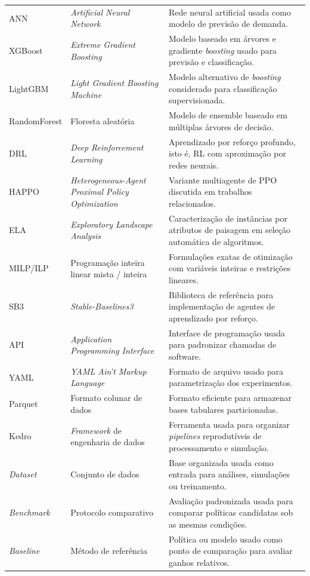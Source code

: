 \begin{longtable}{@{}>{\raggedright\arraybackslash}p{2.35cm}>{\raggedright\arraybackslash}p{5.05cm}>{\raggedright\arraybackslash}p{7.15cm}@{}}
ANN & \textit{Artificial Neural Network} & Rede neural artificial usada como modelo de previsão de demanda. \\
XGBoost & \textit{Extreme Gradient Boosting} & Modelo baseado em árvores e gradiente \textit{boosting} usado para previsão e classificação. \\
LightGBM & \textit{Light Gradient Boosting Machine} & Modelo alternativo de \textit{boosting} considerado para classificação supervisionada. \\
RandomForest & Floresta aleatória & Modelo de ensemble baseado em múltiplas árvores de decisão. \\
DRL & \textit{Deep Reinforcement Learning} & Aprendizado por reforço profundo, isto é, RL com aproximação por redes neurais. \\
HAPPO & \textit{Heterogeneous-Agent Proximal Policy Optimization} & Variante multiagente de PPO discutida em trabalhos relacionados. \\
ELA & \textit{Exploratory Landscape Analysis} & Caracterização de instâncias por atributos de paisagem em seleção automática de algoritmos. \\
MILP/ILP & Programação inteira linear mista / inteira & Formulações exatas de otimização com variáveis inteiras e restrições lineares. \\
SB3 & \textit{Stable-Baselines3} & Biblioteca de referência para implementação de agentes de aprendizado por reforço. \\
API & \textit{Application Programming Interface} & Interface de programação usada para padronizar chamadas de software. \\
YAML & \textit{YAML Ain't Markup Language} & Formato de arquivo usado para parametrização dos experimentos. \\
Parquet & Formato colunar de dados & Formato eficiente para armazenar bases tabulares particionadas. \\
Kedro & \textit{Framework} de engenharia de dados & Ferramenta usada para organizar \textit{pipelines} reprodutíveis de processamento e simulação. \\
\textit{Dataset} & Conjunto de dados & Base organizada usada como entrada para análises, simulações ou treinamento. \\
\textit{Benchmark} & Protocolo comparativo & Avaliação padronizada usada para comparar políticas candidatas sob as mesmas condições. \\
\textit{Baseline} & Método de referência & Política ou modelo usado como ponto de comparação para avaliar ganhos relativos. \\

\end{longtable}
